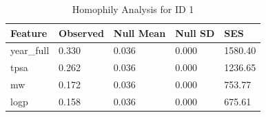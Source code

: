 \begin{table}
\caption{Homophily Analysis for ID 1}
\label{tab:homophily_id1}
\begin{tabular}{lllll}
\toprule
Feature & Observed & Null Mean & Null SD & SES \\
\midrule
year_full & 0.330 & 0.036 & 0.000 & 1580.40 \\
tpsa & 0.262 & 0.036 & 0.000 & 1236.65 \\
mw & 0.172 & 0.036 & 0.000 & 753.77 \\
logp & 0.158 & 0.036 & 0.000 & 675.61 \\
\bottomrule
\end{tabular}
\end{table}
